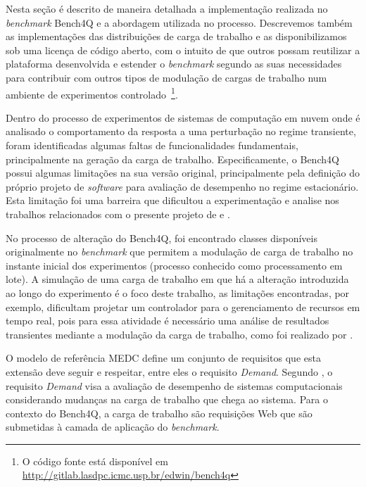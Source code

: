 Nesta seção é descrito de maneira detalhada a implementação realizada no \textit{benchmark} Bench4Q e a abordagem utilizada no processo. Descrevemos também as implementações das distribuições de carga de trabalho e as disponibilizamos sob uma licença de código aberto, com o intuito de que outros possam reutilizar a plataforma desenvolvida e estender o \textit{benchmark} segundo as suas necessidades para contribuir com outros tipos de modulação de cargas de trabalho num ambiente de experimentos controlado~\footnote{O código fonte está disponível em \href{URL}{http://gitlab.lasdpc.icmc.usp.br/edwin/bench4q}}.

Dentro do processo de experimentos de sistemas de computação em nuvem onde é analisado o comportamento da resposta a uma perturbação no regime transiente, foram identificadas algumas faltas de funcionalidades fundamentais, principalmente na geração da carga de trabalho. Especificamente, o Bench4Q possui algumas limitações na sua versão original, principalmente pela definição do próprio projeto de \textit{software} para avaliação de desempenho no regime estacionário. Esta limitação foi uma barreira que dificultou a experimentação e analise nos trabalhos relacionados com o presente projeto de  e .

No processo de alteração do Bench4Q, foi encontrado classes disponíveis originalmente no \textit{benchmark} que permitem a modulação de carga de trabalho no instante inicial dos experimentos (processo conhecido como processamento em lote). A simulação de uma carga de trabalho em que há a alteração introduzida ao longo do experimento é o foco deste trabalho, as limitações encontradas, por exemplo, dificultam projetar um controlador para o gerenciamento de recursos em tempo real, pois para essa atividade é necessário uma análise de resultados transientes mediante a modulação da carga de trabalho, como foi realizado por . 

O modelo de referência MEDC define um conjunto de requisitos que esta extensão deve seguir e respeitar, entre eles o requisito \textit{Demand}. Segundo , o requisito \textit{Demand} visa a avaliação de desempenho de sistemas computacionais considerando mudanças na carga de trabalho que chega ao sistema. Para o contexto do Bench4Q, a carga de trabalho são requisições Web que são submetidas à camada de aplicação do \textit{benchmark}. 


